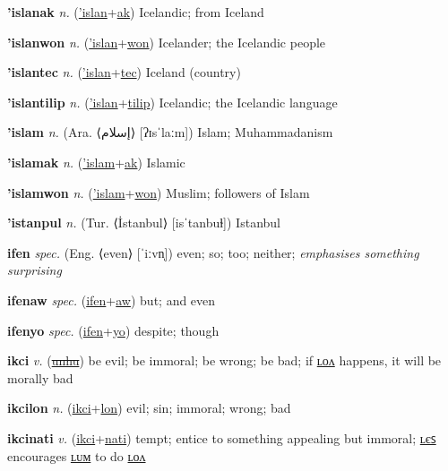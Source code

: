 \textbf{\hypertarget{'islanak}{'islanak}} \textit{n.} (\hyperlink{'islan}{'islan}+\allowbreak \hyperlink{ak}{ak})
Icelandic; from Iceland

\textbf{\hypertarget{'islanwon}{'islanwon}} \textit{n.} (\hyperlink{'islan}{'islan}+\allowbreak \hyperlink{won}{won})
Icelander; the Icelandic people

\textbf{\hypertarget{'islantec}{'islantec}} \textit{n.} (\hyperlink{'islan}{'islan}+\allowbreak \hyperlink{tec}{tec})
Iceland (country)

\textbf{\hypertarget{'islantilip}{'islantilip}} \textit{n.} (\hyperlink{'islan}{'islan}+\allowbreak \hyperlink{tilip}{tilip})
Icelandic; the Icelandic language

\textbf{\hypertarget{'islam}{'islam}} \textit{n.} (Ara. ⟨{\arabics{}إسلام}⟩ [ʔɪsˈlaːm])
Islam; Muhammadanism

\textbf{\hypertarget{'islamak}{'islamak}} \textit{n.} (\hyperlink{'islam}{'islam}+\allowbreak \hyperlink{ak}{ak})
Islamic

\textbf{\hypertarget{'islamwon}{'islamwon}} \textit{n.} (\hyperlink{'islam}{'islam}+\allowbreak \hyperlink{won}{won})
Muslim; followers of Islam

\textbf{\hypertarget{'istanpul}{'istanpul}} \textit{n.} (Tur. ⟨İstanbul⟩ [isˈtanbuɫ])
Istanbul

\textbf{\hypertarget{ifen}{ifen}} \textit{spec.} (Eng. ⟨even⟩ [ˈiːvn̩])
even; so; too; neither; \textit{emphasises something surprising}

\textbf{\hypertarget{ifenaw}{ifenaw}} \textit{spec.} (\hyperlink{ifen}{ifen}+\allowbreak \hyperlink{aw}{aw})
but; and even

\textbf{\hypertarget{ifenyo}{ifenyo}} \textit{spec.} (\hyperlink{ifen}{ifen}+\allowbreak \hyperlink{yo}{yo})
despite; though

\textbf{\hypertarget{ikci}{ikci}} \textit{v.} (\hyperlink{unhu}{\sout{unhu}})
be evil; be immoral; be wrong; be bad; if \hyperlink{ikcilon}{ʟᴏᴧ} happens, it will be morally bad

\textbf{\hypertarget{ikcilon}{ikcilon}} \textit{n.} (\hyperlink{ikci}{ikci}+\allowbreak \hyperlink{lon}{lon})
evil; sin; immoral; wrong; bad

\textbf{\hypertarget{ikcinati}{ikcinati}} \textit{v.} (\hyperlink{ikci}{ikci}+\allowbreak \hyperlink{nati}{nati})
tempt; entice to something appealing but immoral; \hyperlink{ikcinatiles}{ʟєꜱ} encourages \hyperlink{ikcinatilum}{ʟᴜᴍ} to do \hyperlink{ikcinatilon}{ʟᴏᴧ}

